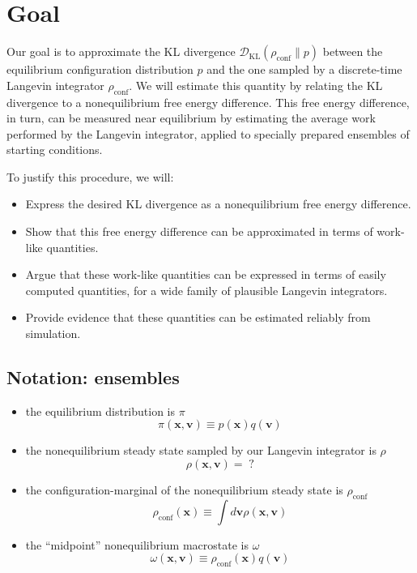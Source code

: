 \documentclass[11pt]{article}
\newcommand{\x}{\mathbf{x}}
\newcommand{\vel}{\mathbf{v}}
\newcommand{\kldiv}{\mathcal{D}_\text{KL}}
\newcommand{\conf}{\rho_\text{conf}}
\begin{document}
\section{Goal}
Our goal is to approximate the KL divergence $\kldiv(\conf \| p)$ between the equilibrium configuration distribution $p$ and the one sampled by a discrete-time Langevin integrator $\conf$.
We will estimate this quantity by relating the KL divergence to a nonequilibrium free energy difference. This free energy difference, in turn, can be measured near equilibrium by estimating the average work performed by the Langevin integrator, applied to specially prepared ensembles of starting conditions.

To justify this procedure, we will:
\begin{itemize}
\item Express the desired KL divergence as a nonequilibrium free energy difference.
\item Show that this free energy difference can be approximated in terms of work-like quantities.
\item Argue that these work-like quantities can be expressed in terms of easily computed quantities, for a wide family of plausible Langevin integrators.
\item Provide evidence that these quantities can be estimated reliably from simulation.
\end{itemize}

\subsection{Notation: ensembles}
\begin{itemize}
\item the equilibrium distribution is $\pi$
$$\pi(\x, \vel) \equiv p(\x) q(\vel)$$
\item the nonequilibrium steady state sampled by our Langevin integrator is $\rho$
$$\rho(\x, \vel) = \; ?$$
\item the configuration-marginal of the nonequilibrium steady state is $\conf$
$$\conf(\x) \equiv \int d\vel \rho(\x, \vel)$$
\item the ``midpoint'' nonequilibrium macrostate is $\omega$
$$\omega(\x, \vel) \equiv \conf (\x) q(\vel)$$
\end{itemize}
\end{document}
